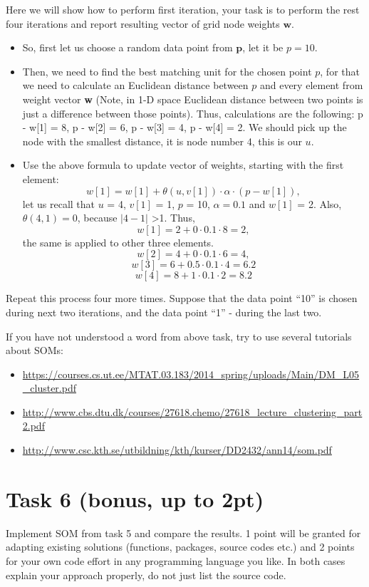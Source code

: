 \documentclass{article}
\begin{document}
Here we will show how to perform first iteration, your task is to perform the rest four iterations and report resulting vector of grid node weights  $\textbf{w}$.
\begin{itemize}
\item So, first let us choose a random data point from $\textbf{p}$, let it be $p = 10$.
\item Then, we need to find the best matching unit for the chosen point $p$, for that we need to calculate an Euclidean distance between $p$ and every element from weight vector \textbf{w} (Note, in 1-D space Euclidean distance between two points is just a difference between those points). Thus, calculations are the following: p - w[1] = 8, p - w[2] = 6, p - w[3] = 4, p - w[4] = 2. We should pick up the node with the smallest distance, it is node number 4, this is our $u$.
\item Use the above formula to update vector of weights, starting with the first element:
$$
w[1] = w[1] + \theta(u, v[1])\cdot\alpha\cdot(p - w[1]),
$$
let us recall that $u$ = 4, $v[1]$ = 1, $p$ = 10, $\alpha = 0.1$ and $w[1]$ = 2. Also, $\theta(4, 1) = 0$, because $|4 - 1|$ \textgreater  1. Thus,
$$
w[1] = 2 + 0\cdot0.1\cdot8 = 2,
$$
the same is applied to other three elements.
$$
w[2] = 4 +  0\cdot0.1\cdot6 = 4,
$$
$$
w[3] = 6 + 0.5\cdot0.1\cdot4 = 6.2
$$
$$
w[4] = 8 + 1\cdot0.1\cdot2 = 8.2
$$
\end{itemize}
Repeat this process four more times. Suppose that the data point ``10'' is chosen during next two iterations, and the data point ``1'' - during the last two.

If you have not understood a word from above task, try to use several tutorials about SOMs:
\begin{itemize}
\item \url{https://courses.cs.ut.ee/MTAT.03.183/2014_spring/uploads/Main/DM_L05_cluster.pdf}
\item \url{http://www.cbs.dtu.dk/courses/27618.chemo/27618_lecture_clustering_part2.pdf}
\item \url{http://www.csc.kth.se/utbildning/kth/kurser/DD2432/ann14/som.pdf}
\end{itemize}
\section*{Task 6 (bonus, up to 2pt)}
Implement SOM from task 5 and compare the results. 1 point will be granted for adapting existing solutions (functions, packages, source codes etc.) and 2 points for your own code effort in any programming language you like. In both cases explain your approach properly, do not just list the source code. 
\end{document}
